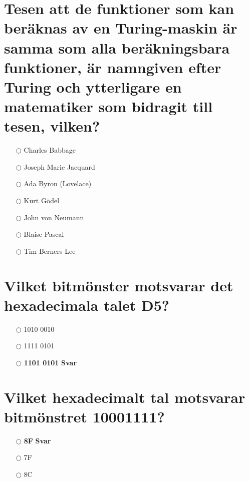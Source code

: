 \documentclass[a4paper,11pt,oneside]{book}
\begin{document}
\begin{sloppypar}
\section{Tesen att de funktioner som kan ber\"aknas av en Turing-maskin \"ar samma som alla ber\"akningsbara funktioner, \"ar namngiven efter Turing och ytterligare en matematiker som bidragit till tesen, vilken?}

\label{q:442:mc:sv:True}

\begin{itemize}
  \item[$\bigcirc$] Charles Babbage
  \item[$\bigcirc$] Joseph Marie Jacquard
  \item[$\bigcirc$] Ada Byron (Lovelace)
  \item[$\bigcirc$] Kurt G\"odel
  \item[$\bigcirc$] John von Neumann
  \item[$\bigcirc$] Blaise Pascal
  \item[$\bigcirc$] Tim Berners-Lee
\end{itemize}



\section{Vilket bitm\"onster motsvarar det hexadecimala talet D5?}

\label{q:443:mc:sv:True}

\begin{itemize}
  \item[$\bigcirc$] 1010 0010
  \item[$\bigcirc$] 1111 0101
  \item[$\bigcirc$] \textbf{1101 0101} \hfill \textbf{Svar}
\end{itemize}



\section{Vilket hexadecimalt tal motsvarar bitm\"onstret 10001111?}

\label{q:444:mc:sv:True}

\begin{itemize}
  \item[$\bigcirc$] \textbf{8F} \hfill \textbf{Svar}
  \item[$\bigcirc$] 7F
  \item[$\bigcirc$] 8C
\end{itemize}


\end{sloppypar}
\end{document}
